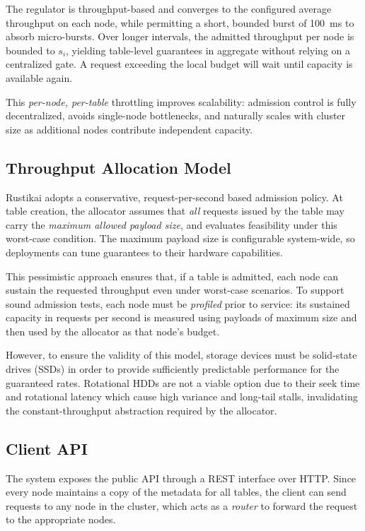 The regulator is throughput-based and converges to the configured average throughput on
each node, while permitting a short, bounded burst of \qty{100}{\milli\second}
to absorb micro-bursts.
Over longer intervals, the admitted throughput per node is bounded to $s_i$,
yielding table-level guarantees in aggregate without relying on a centralized
gate.
A request exceeding the local budget will wait until capacity is available
again.

This \emph{per-node, per-table} throttling improves scalability: admission
control is fully decentralized, avoids single-node bottlenecks, and naturally
scales with cluster size as additional nodes contribute independent capacity.

\subsection{Throughput Allocation Model}
\label{subsec:throughput-model}

Rustikai adopts a conservative, request-per-second based admission policy.
At table creation, the allocator assumes that \emph{all} requests issued by the
table may carry the \emph{maximum allowed payload size}, and evaluates
feasibility under this worst-case condition.
The maximum payload size is configurable system-wide, so
deployments can tune guarantees to their hardware capabilities.

This pessimistic approach ensures that, if a table is admitted, each node can
sustain the requested throughput even under worst-case scenarios.
To support sound admission tests, each node must be \emph{profiled} prior to
service: its sustained capacity in requests per second is measured using
payloads of maximum size and then used by the allocator as that node's
budget.

However, to ensure the validity of this model, storage devices must be
solid-state drives (SSDs) in order to provide sufficiently predictable
performance for the guaranteed rates.
Rotational HDDs are not a viable option due to their seek time and rotational
latency which cause high variance and long-tail stalls, invalidating the
constant-throughput abstraction required by the allocator.

\subsection{Client API}
\label{subsec:interface}

The system exposes the public API through a REST interface over HTTP\@.
Since every node maintains a copy of the metadata for all tables, the client
can send requests to any node in the cluster, which acts as a \emph{router} to
forward the request to the appropriate nodes.

